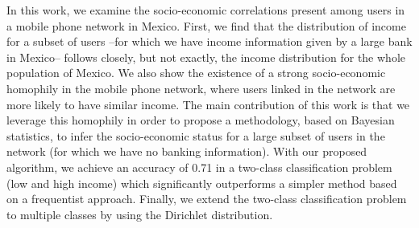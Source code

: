 

In this work, we examine the socio-economic correlations present among users in a mobile phone network in Mexico. First, we find that the distribution of income for a subset of users --for which we have income information given by a large bank in Mexico-- follows closely, but not exactly, the income distribution for the whole population of Mexico. We also show the existence of a strong socio-economic homophily in the mobile phone network, where users linked in the network are more likely to have similar income. The main contribution of this work is that we leverage this homophily in order to propose a methodology, based on Bayesian statistics, to infer the socio-economic status for a large subset of users in the network (for which we have no banking information). With our proposed algorithm, we achieve an accuracy of 0.71 in a two-class classification problem (low and high income) which significantly outperforms a simpler method based on a frequentist approach. Finally, we extend the two-class classification problem to multiple classes by using the Dirichlet distribution.
